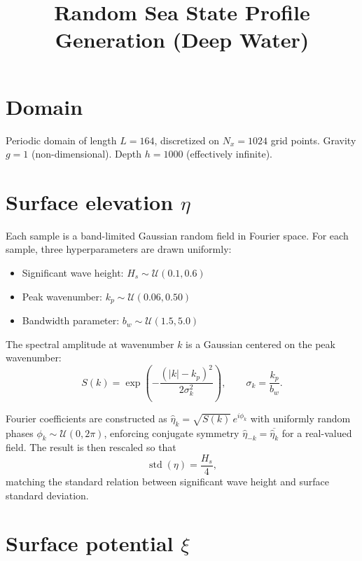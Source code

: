 \documentclass[11pt]{article}
\title{Random Sea State Profile Generation (Deep Water)}
\author{}
\date{}
\begin{document}
\maketitle

\section{Domain}

Periodic domain of length $L = 164$, discretized on $N_x = 1024$ grid points. Gravity $g = 1$ (non-dimensional). Depth $h = 1000$ (effectively infinite).

\section{Surface elevation $\eta$}

Each sample is a band-limited Gaussian random field in Fourier space. For each sample, three hyperparameters are drawn uniformly:
\begin{itemize}
    \item Significant wave height: $H_s \sim \mathcal{U}(0.1, 0.6)$
    \item Peak wavenumber: $k_p \sim \mathcal{U}(0.06, 0.50)$
    \item Bandwidth parameter: $b_w \sim \mathcal{U}(1.5, 5.0)$
\end{itemize}

The spectral amplitude at wavenumber $k$ is a Gaussian centered on the peak wavenumber:
\begin{equation}
    S(k) = \exp\!\left(-\frac{(|k| - k_p)^2}{2\sigma_k^2}\right), \qquad \sigma_k = \frac{k_p}{b_w}.
\end{equation}

Fourier coefficients are constructed as $\hat{\eta}_k = \sqrt{S(k)}\, e^{i\phi_k}$ with uniformly random phases $\phi_k \sim \mathcal{U}(0, 2\pi)$, enforcing conjugate symmetry $\hat{\eta}_{-k} = \overline{\hat{\eta}_k}$ for a real-valued field. The result is then rescaled so that
\begin{equation}
    \operatorname{std}(\eta) = \frac{H_s}{4},
\end{equation}
matching the standard relation between significant wave height and surface standard deviation.

\section{Surface potential $\xi$}
\end{document}
